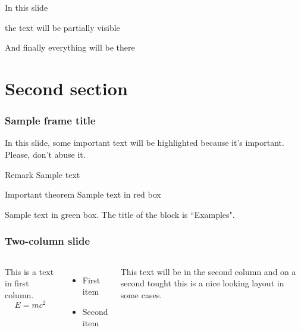 \documentclass[xcolor=dvipsnames, size=custom,width=120,height=90,scale=1.17]{beamer}
\begin{document}


\begin{frame}
In this slide \pause

the text will be partially visible \pause

And finally everything will be there
\end{frame}

\section{Second section}

\begin{frame}
\frametitle{Sample frame title}

In this slide, some important text will be
\alert{highlighted} because it's important.
Please, don't abuse it.

\begin{block}{Remark}
Sample text
\end{block}

\begin{alertblock}{Important theorem}
Sample text in red box
\end{alertblock}

\begin{examples}
Sample text in green box. The title of the block is ``Examples".
\end{examples}
\end{frame}


\begin{frame}
\frametitle{Two-column slide}

\begin{columns}

This is a text in first column.
$$E=mc^2$$
\begin{itemize}
\item First item
\item Second item
\end{itemize}

This text will be in the second column
and on a second tought this is a nice looking
layout in some cases.
\end{columns}
\end{frame}
\end{document}
